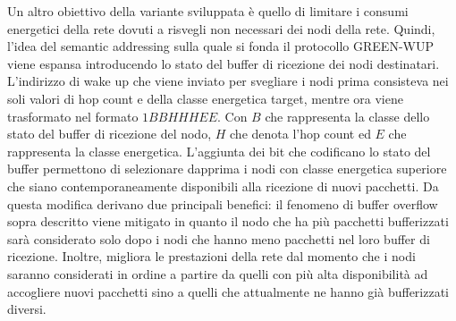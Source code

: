 \documentclass[binding=0.6cm,TFA]{sapthesis}
\begin{document}
Un altro obiettivo della variante sviluppata è quello di limitare i consumi energetici della rete dovuti a risvegli non necessari dei nodi della rete. Quindi,
l'idea del semantic addressing sulla quale si fonda il protocollo GREEN-WUP viene espansa introducendo lo stato del buffer di ricezione dei nodi destinatari.
L'indirizzo di wake up che viene inviato per svegliare i nodi prima consisteva nei soli valori di hop count e della classe energetica target, mentre ora viene
trasformato nel formato $1BBHHHEE$. Con $B$ che rappresenta la classe dello stato del buffer di ricezione del nodo, $H$ che denota l'hop count ed $E$ che
rappresenta la classe energetica. L'aggiunta dei bit che codificano lo stato del buffer permettono di selezionare dapprima i nodi con classe energetica
superiore che siano contemporaneamente disponibili alla ricezione di nuovi pacchetti. Da questa modifica derivano due principali benefici: il fenomeno
di buffer overflow sopra descritto viene mitigato in quanto il nodo che ha più pacchetti bufferizzati sarà considerato solo dopo i nodi che hanno meno
pacchetti nel loro buffer di ricezione. Inoltre, migliora le prestazioni della rete dal momento che i nodi saranno considerati in ordine a partire da quelli
con più alta disponibilità ad accogliere nuovi pacchetti sino a quelli che attualmente ne hanno già bufferizzati diversi.\\
\end{document}
